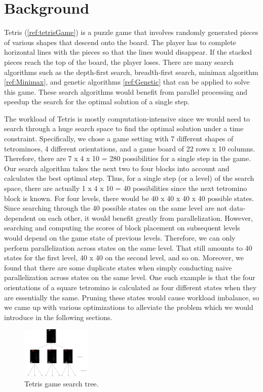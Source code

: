 
\section{Background}

Tetris (\ref{ref:tetrisGame}) is a puzzle game that involves randomly generated pieces of various shapes that descend onto the board. The player has to complete horizontal lines with the pieces so that the lines would disappear. If the stacked pieces reach the top of the board, the player loses. There are many search algorithms such as the depth-first search, breadth-first search, minimax algorithm \ref{ref:Minimax}, and genetic algorithms \ref{ref:Genetic} that can be applied to solve this game. These search algorithms would benefit from parallel processing and speedup the search for the optimal solution of a single step.

The workload of Tetris is mostly computation-intensive since we would need to search through a huge search space to find the optimal solution under a time constraint. Specifically, we chose a game setting with 7 different shapes of tetrominoes, 4 different orientations, and a game board of 22 rows x 10 columns. Therefore, there are 7 x 4 x 10 = 280 possibilities for a single step in the game. Our search algorithm takes the next two to four blocks into account and calculates the best optimal step.  Thus, for a single step (or a level) of the search space, there are actually 1 x 4 x 10 = 40 possibilities since the next tetromino block is known. For four levels, there would be 40 x 40 x 40 x 40 possible states. Since searching through the 40 possible states on the same level are not data-dependent on each other, it would benefit greatly from parallelization. However, searching and computing the scores of block placement on subsequent levels would depend on the game state of previous levels. Therefore, we can only perform parallelization across states on the same level. That still amounts to 40 states for the first level, 40 x 40 on the second level, and so on. Moreover, we found that there are some duplicate states when simply conducting naive parallelization across states on the same level. One such example is that the four orientations of a square tetromino is calculated as four different states when they are essentially the same. Pruning these states would cause workload imbalance, so we came up with various optimizations to alleviate the problem which we would introduce in the following sections.

\begin{figure}[h]
	\centering
	\includegraphics[width=0.3\textwidth]{search_space.png}
	\vspace{-1em}
	\caption{Tetris game search tree.}
	\label{fig:search_space}
\end{figure}

